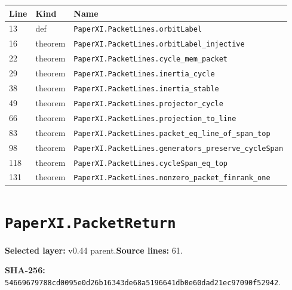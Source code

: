 \documentclass[10pt,oneside]{book}
\begin{document}
\begin{longtable}{@{}p{}p{}p{}@{}}\toprule Line&Kind&Name\\\midrule\endhead

13&def&\nolinkurl{PaperXI.PacketLines.orbitLabel}\\

16&theorem&\nolinkurl{PaperXI.PacketLines.orbitLabel_injective}\\

22&theorem&\nolinkurl{PaperXI.PacketLines.cycle_mem_packet}\\

29&theorem&\nolinkurl{PaperXI.PacketLines.inertia_cycle}\\

38&theorem&\nolinkurl{PaperXI.PacketLines.inertia_stable}\\

49&theorem&\nolinkurl{PaperXI.PacketLines.projector_cycle}\\

66&theorem&\nolinkurl{PaperXI.PacketLines.projection_to_line}\\

83&theorem&\nolinkurl{PaperXI.PacketLines.packet_eq_line_of_span_top}\\

98&theorem&\nolinkurl{PaperXI.PacketLines.generators_preserve_cycleSpan}\\

118&theorem&\nolinkurl{PaperXI.PacketLines.cycleSpan_eq_top}\\

131&theorem&\nolinkurl{PaperXI.PacketLines.nonzero_packet_finrank_one}\\

\bottomrule\end{longtable}

\section{\texorpdfstring{\nolinkurl{PaperXI.PacketReturn}}{PaperXI.PacketReturn}}\label{module:PaperXI.PacketReturn}

\textbf{Selected layer:} v0.44 parent.\quad\textbf{Source lines:} 61.\par\textbf{SHA-256:} {\scriptsize\nolinkurl{54669679788cd0095e0d26b16343de68a5196641db0e60dad21ec97090f52942}}.

\end{document}
